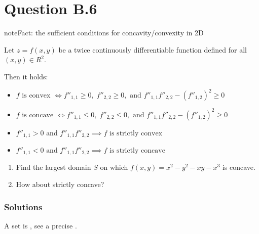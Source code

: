 \documentclass[letterpaper,10pt,english]{jupyterBook}
\begin{document}
\section{Question B.6}
\label{\detokenize{03.exercises:question-b-6}}
\begin{sphinxadmonition}{note}{Fact: the sufficient conditions for concavity/convexity in 2D}

\sphinxAtStartPar
Let \(z = f(x,y)\) be a twice continuously differentiable function defined for all
\((x, y) \in R^2\).

\sphinxAtStartPar
Then it holds:
\begin{itemize}
\item {} 
\sphinxAtStartPar
\(f \text{ is convex } \iff f''_{1,1} \ge 0, \; f''_{2,2} \ge 0 , \text{ and } f''_{1,1} f''_{2,2} − (f''_{1,2})^2 \ge 0\)

\item {} 
\sphinxAtStartPar
\(f \text{ is concave } \iff f''_{1,1} \le 0, \; f''_{2,2} \le 0 , \text{ and } f''_{1,1} f''_{2,2} − (f''_{1,2})^2 \ge 0\)

\item {} 
\sphinxAtStartPar
\(f''_{1,1} > 0 \text{ and } f''_{1,1} f''_{2,2} \implies f \text{ is strictly convex}\)

\item {} 
\sphinxAtStartPar
\(f''_{1,1} < 0 \text{ and } f''_{1,1} f''_{2,2} \implies f \text{ is strictly concave}\)

\end{itemize}
\end{sphinxadmonition}
\begin{enumerate}
%
\item {} 
\sphinxAtStartPar
Find the largest domain \(S\) on which
\(f(x, y) = x^2 − y^2 − xy − x^3\) is concave.

\item {} 
\sphinxAtStartPar
How about strictly concave?

\end{enumerate}
\subsubsection*{Solutions}

\sphinxAtStartPar
{}

\sphinxAtStartPar
A set is , see a precise {\hyperref[\detokenize{03.set_theory:ref-set-defition}]{}}.
\end{document}
